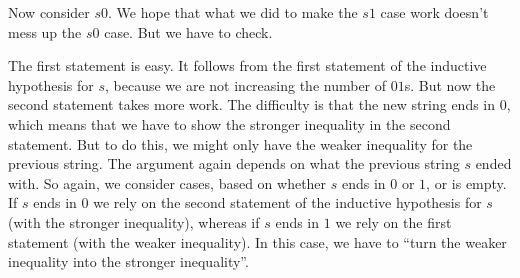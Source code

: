 \begin{definition}
Now consider $s0$.  We hope that what we did to make the $s1$ case
work doesn't mess up the $s0$ case.  But we have to check.

The first statement is easy.  It follows from the first statement of
the inductive hypothesis for $s$, because we are not increasing the
number of $01$s.  But now the second statement takes more work.  The
difficulty is that the new string ends in $0$, which means that we
have to show the stronger inequality in the second statement.  But to
do this, we might only have the weaker inequality for the previous
string.  The argument again depends on what the previous string $s$
ended with.  So again, we consider cases, based on whether $s$ ends in
$0$ or $1$, or is empty.  If $s$ ends in $0$ we rely on the second
statement of the inductive hypothesis for $s$ (with the stronger
inequality), whereas if $s$ ends in $1$ we rely on the first statement
(with the weaker inequality).  In this case, we have to ``turn the
weaker inequality into the stronger inequality''.

\end{definition}
